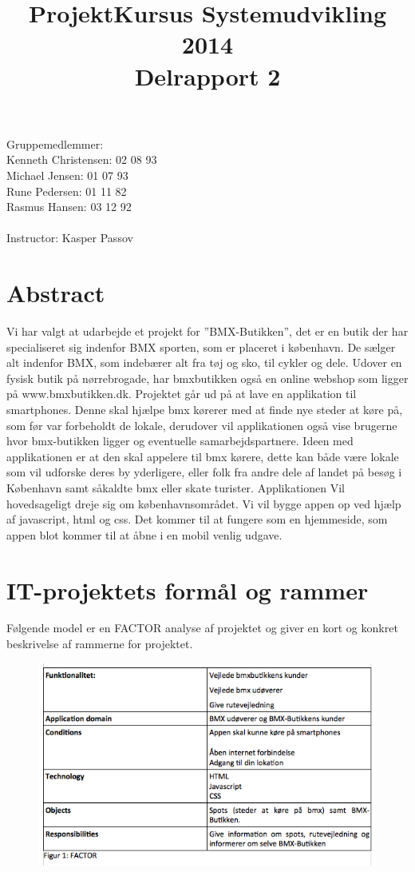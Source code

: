 \documentclass[12pt]{article}
\title{ProjektKursus Systemudvikling 2014\\Delrapport 2}
\author{}
\begin{document}
\maketitle
Gruppemedlemmer:\\
Kenneth Christensen: 02 08 93\\Michael Jensen: 01 07 93\\Rune Pedersen: 01 11 82\\Rasmus Hansen: 03 12 92
\\\\
Instructor: Kasper Passov

\pagebreak
\section{Abstract}
Vi har valgt at udarbejde et projekt for  ”BMX-Butikken”, det er en butik der har specialiseret sig indenfor BMX sporten, som er placeret i københavn.  De sælger alt indenfor BMX, som indebærer alt fra tøj og sko, til cykler og dele. Udover en fysisk butik på nørrebrogade, har bmxbutikken også en online webshop som ligger på www.bmxbutikken.dk.
Projektet går ud på at lave en applikation til smartphones. Denne skal hjælpe bmx kørerer med at finde nye steder at køre på, som før var forbeholdt de lokale, derudover vil applikationen også vise  brugerne hvor bmx-butikken ligger og eventuelle samarbejdspartnere.
Ideen med applikationen er at den skal appelere til bmx kørere, dette kan både være lokale som vil udforske deres by yderligere, eller folk fra andre dele af landet på besøg i København samt såkaldte bmx eller skate turister. Applikationen Vil hovedsageligt dreje sig om københavnsområdet.
Vi vil bygge appen op ved hjælp af javascript, html og css. Det kommer til at fungere som en hjemmeside, som appen blot kommer til at åbne i en mobil venlig udgave.

\section{IT-projektets formål og rammer}
Følgende model er en FACTOR analyse af projektet og giver en kort og konkret beskrivelse af rammerne for projektet.
\begin{figure}[h]
    \includegraphics[scale=0.5]{factor.png}
\end{figure}
\end{document}
